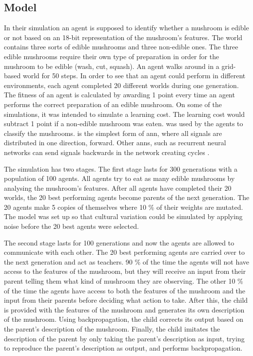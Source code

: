 \subsection{Model}
 In their simulation an agent is supposed to identify whether a mushroom is edible or not based on an 18-bit representation of the mushroom's features. The world contains three sorts of edible mushrooms and three non-edible ones. The three edible mushrooms require their own type of preparation in order for the mushroom to be edible (wash, cut, squash). An agent walks around in a grid-based world for 50 steps. In order to see that an agent could perform in different environments, each agent completed 20 different worlds during one generation. The fitness of an agent is calculated by awarding 1 point every time an agent performs the correct preparation of an edible mushroom. On some of the simulations, it was intended to simulate a learning cost. The learning cost would subtract 1 point if a non-edible mushroom was eaten.   was used by the agents to classify the mushrooms.  is the simplest form of \ac{ann}, where all signals are distributed in one direction, forward. Other \acp{ann}, such as recurrent neural networks can send signals backwards in the network creating cycles \citep{jain1996artificial}.

The simulation has two stages. The first stage lasts for 300 generations with a population of 100 agents. All agents try to eat as many edible mushrooms by analysing the mushroom's features. After all agents have completed their 20 worlds, the 20 best performing agents become parents of the next generation. The 20 agents make 5 copies of themselves where 10 \% of their weights are mutated. The model was set up so that cultural variation could be simulated by applying noise before the 20 best agents were selected.

The second stage lasts for 100 generations and now the agents are allowed to communicate with each other. The 20 best performing agents are carried over to the next generation and act as teachers. 90 \% of the time the agents will not have access to the features of the mushroom, but they will receive an input from their parent telling them what kind of mushroom they are observing. The other 10 \% of the time the agents have access to both the features of the mushroom and the input from their parents before deciding what action to take. After this, the child is provided with the features of the mushroom and generates its own description of the mushroom. Using backpropagation, the child corrects its output based on the parent's description of the mushroom. Finally, the child imitates the description of the parent by only taking the parent's description as input, trying to reproduce the parent's description as output, and performs backpropagation.

